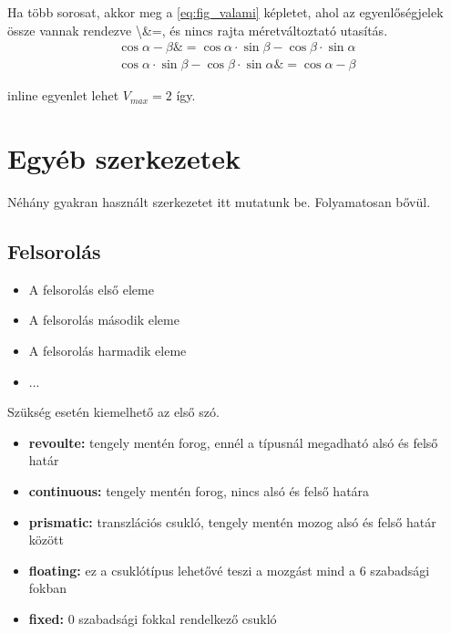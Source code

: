 \documentclass[12pt,a4paper]{article}
\begin{document}
    Ha több sorosat, akkor meg a \ref{eq:fig_valami} képletet, ahol az egyenlőségjelek össze vannak rendezve \textbackslash \&=, és nincs rajta méretváltoztató utasítás.
    \begin{equation}
        \begin{aligned}
        \cos{\alpha-\beta} \&= \cos{\alpha}\cdot\sin{\beta}-\cos{\beta}\cdot\sin{\alpha}\\
         \cos{\alpha}\cdot\sin{\beta}-\cos{\beta}\cdot\sin{\alpha} \&= \cos{\alpha-\beta}
        \end{aligned}
        \label{eq:fig_valami}
    \end{equation}	
    
    inline egyenlet lehet \(V_{max}=2 \) így. 

	\section{Egyéb szerkezetek}
	Néhány gyakran használt szerkezetet itt mutatunk be. Folyamatosan bővül.
	
	\subsection{Felsorolás}
		
		\begin{itemize}
			\item A felsorolás első eleme
			\item A felsorolás második eleme
			\item A felsorolás harmadik eleme
			\item ...
		\end{itemize}
	
		Szükség esetén kiemelhető az első szó.
		
		\begin{itemize}
			\item \textbf{revoulte:} tengely mentén forog, ennél a típusnál megadható alsó és felső határ
			\item \textbf{continuous:} tengely mentén forog, nincs alsó és felső határa
			\item \textbf{prismatic:} transzlációs csukló, tengely mentén mozog alsó és felső határ között
			\item \textbf{floating:} ez a csuklótípus lehetővé teszi a mozgást mind a 6 szabadsági fokban
			\item \textbf{fixed:} 0 szabadsági fokkal rendelkező csukló
		\end{itemize}
		
\end{document}
